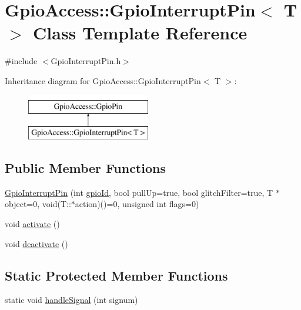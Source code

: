\hypertarget{class_gpio_access_1_1_gpio_interrupt_pin}{\section{\-Gpio\-Access\-:\-:\-Gpio\-Interrupt\-Pin$<$ \-T $>$ \-Class \-Template \-Reference}
\label{class_gpio_access_1_1_gpio_interrupt_pin}
}


{\ttfamily \#include $<$\-Gpio\-Interrupt\-Pin.\-h$>$}

\-Inheritance diagram for \-Gpio\-Access\-:\-:\-Gpio\-Interrupt\-Pin$<$ \-T $>$\-:\begin{figure}[H]
\begin{center}
\leavevmode
\includegraphics[height=2.000000cm]{class_gpio_access_1_1_gpio_interrupt_pin}
\end{center}
\end{figure}
\subsection*{\-Public \-Member \-Functions}
\begin{DoxyCompactItemize}
\item 
\hyperlink{class_gpio_access_1_1_gpio_interrupt_pin_a73479cbcb8f93e168a8e425d847fab3f}{\-Gpio\-Interrupt\-Pin} (int \hyperlink{class_gpio_access_1_1_gpio_pin_a662d9f6e22d338e0b182b3220a42f25d}{gpio\-Id}, bool pull\-Up=true, bool glitch\-Filter=true, \-T $\ast$object=0, void(\-T\-::$\ast$action)()=0, unsigned int flags=0)
\item 
void \hyperlink{class_gpio_access_1_1_gpio_interrupt_pin_abc83efbda38bea421c0f2ea237fdb240}{activate} ()
\item 
void \hyperlink{class_gpio_access_1_1_gpio_interrupt_pin_aecf2b47b37dc009ee7e01a9c6c5f7f89}{deactivate} ()
\end{DoxyCompactItemize}
\subsection*{\-Static \-Protected \-Member \-Functions}
\begin{DoxyCompactItemize}
\item 
static void \hyperlink{class_gpio_access_1_1_gpio_interrupt_pin_a81df1ecd14f1bb2d0557c89c70f1e3da}{handle\-Signal} (int signum)
\end{DoxyCompactItemize}
